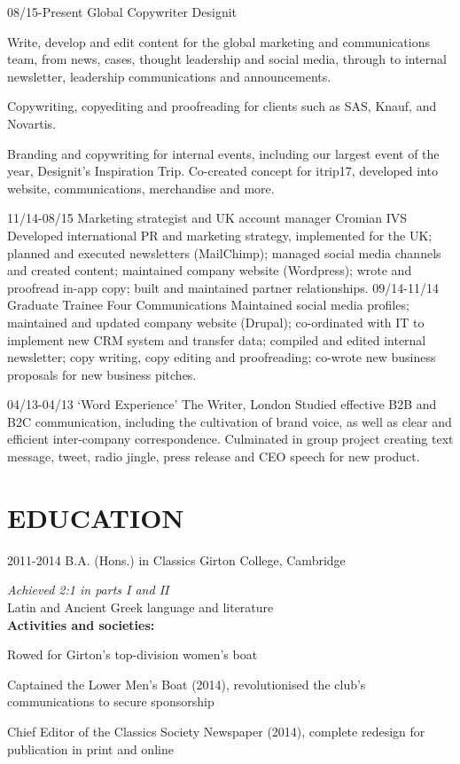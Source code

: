 \documentclass[]{friggeri-cv}
\begin{document}
\begin{entrylist}
	\entry
	{08/15-Present}
	{Global Copywriter}
	{Designit}
	{
		Write, develop and edit content for the global marketing and communications team, from news, cases, thought leadership and social media, through to internal newsletter, leadership communications and announcements.

		Copywriting, copyediting and proofreading for clients such as SAS, Knauf, and Novartis.

		Branding and copywriting for internal events, including our largest event of the year, Designit's Inspiration Trip. Co-created concept for itrip17, developed into website, communications, merchandise and more.
	}
	\entry
	{11/14-08/15}
	{Marketing strategist and UK account manager}
	{Cromian IVS}
	{
		Developed international PR and marketing strategy, implemented for the UK; planned and executed newsletters (MailChimp); managed social media channels and created content; maintained company website (Wordpress); wrote and proofread in-app copy; built and maintained partner relationships.
	}
	\entry
	{09/14-11/14}
	{Graduate Trainee}
	{Four Communications}
	{
		Maintained social media profiles; maintained and updated company website (Drupal); co-ordinated with IT to implement new CRM system and transfer data; compiled and edited internal newsletter; copy writing, copy editing and proofreading; co-wrote new business proposals for new business pitches.
	}
\end{entrylist}
\begin{entrylist}
	\entry
	{04/13-04/13}
	{‘Word Experience’}
	{The Writer, London}
	{
		Studied effective B2B and B2C communication, including the cultivation of brand voice, as well as clear and efficient inter-company correspondence. Culminated in group project creating text message, tweet, radio jingle, press release and CEO speech for new product.
	}
\end{entrylist}

\pagebreak

\section{EDUCATION}

\begin{entrylist}
	\entry
	{2011-2014}
	{B.A. (Hons.) in Classics}
	{Girton College, Cambridge}
	{\emph{Achieved 2:1 in parts I and II}
		\\

		Latin and Ancient Greek language and literature
		\\

		\textbf{Activities and societies:}

		Rowed for Girton's top-division women's boat

		Captained the Lower Men's Boat (2014), revolutionised the club's communications to secure sponsorship

		Chief Editor of the Classics Society Newspaper (2014), complete redesign for publication in print and online
	}
\end{entrylist}
\end{document}
